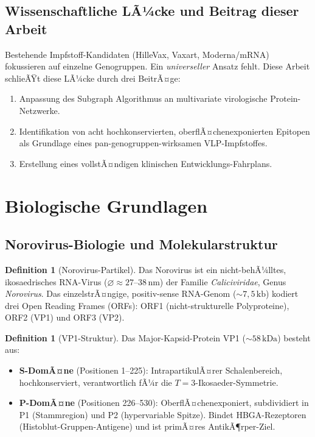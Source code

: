 ﻿\documentclass[a4paper,12pt]{article}
\theoremstyle{plain}
\theoremstyle{definition}
\newtheorem{definition}[satz]{Definition}
\theoremstyle{remark}
\begin{document}
\subsection{Wissenschaftliche LÃ¼cke und Beitrag dieser Arbeit}

Bestehende Impfstoff-Kandidaten (HilleVax, Vaxart, Moderna/mRNA) fokussieren auf einzelne
Genogruppen. Ein \emph{universeller} Ansatz fehlt. Diese Arbeit schlieÃŸt diese LÃ¼cke durch
drei BeitrÃ¤ge:

\begin{enumerate}[label=(\roman*)]
  \item Anpassung des Subgraph Algorithmus \citep{epp2026subgraph} an multivariate
        virologische Protein-Netzwerke.
  \item Identifikation von acht hochkonservierten, oberflÃ¤chenexponierten Epitopen als
        Grundlage eines pan-genogruppen-wirksamen VLP-Impfstoffes.
  \item Erstellung eines vollstÃ¤ndigen klinischen Entwicklungs-Fahrplans.
\end{enumerate}

\section{Biologische Grundlagen}

\subsection{Norovirus-Biologie und Molekularstruktur}

\begin{definition}[Norovirus-Partikel]
Das Norovirus ist ein nicht-behÃ¼lltes, ikosaedrisches RNA-Virus ($\varnothing\approx 27$--$38\,\text{nm}$)
der Familie \textit{Caliciviridae}, Genus \textit{Norovirus}. Das einzelstrÃ¤ngige, positiv-sense
RNA-Genom ($\sim\!7{,}5\,\text{kb}$) kodiert drei Open Reading Frames (ORFs):
ORF1 (nicht-strukturelle Polyproteine), ORF2 (VP1) und ORF3 (VP2).
\end{definition}

\begin{definition}[VP1-Struktur]
Das Major-Kapsid-Protein VP1 (${\sim}58\,\text{kDa}$) besteht aus:
\begin{itemize}
  \item \textbf{S-DomÃ¤ne} (Positionen 1--225): IntrapartikulÃ¤rer Schalenbereich,
        hochkonserviert, verantwortlich fÃ¼r die $T=3$-Ikosaeder-Symmetrie.
  \item \textbf{P-DomÃ¤ne} (Positionen 226--530): OberflÃ¤chenexponiert,
        subdividiert in P1 (Stammregion) und P2 (hypervariable Spitze).
        Bindet HBGA-Rezeptoren (Histoblut-Gruppen-Antigene) und ist primÃ¤res
        AntikÃ¶rper-Ziel.
\end{itemize}
\end{definition}
\end{document}
